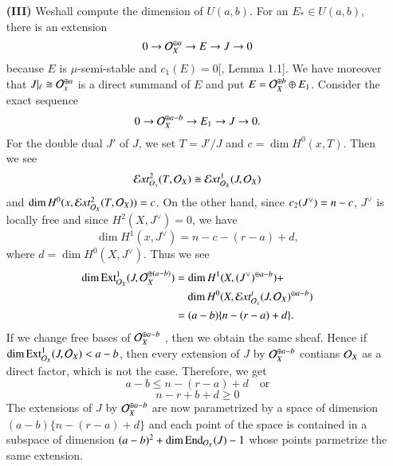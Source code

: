 \begin{itemize}
\item[{\bf(III)}] We\pageoriginale shall compute the dimension of $U(a,b)$. For an $E_{*} \in U(a, b)$, there is an extension
$$
0 \rightarrow \mathcal{O}_{X}^{\oplus a} \rightarrow E \rightarrow J \rightarrow 0
$$
because $E$ is $\mu$-semi-stable and $c_{1}(E) =0$[\cite{art12-key6}, Lemma 1.1]. We have moreover that $ J|_{\ell}\cong \mathcal{O}_{x}^{\oplus a}$ is a direct summand of $E$ and put $E=\mathcal{O}_{X}^{\oplus b} \oplus E_{1}$. Consider the exact sequence
$$
0\rightarrow \mathcal{O}_{X}^{\oplus a-b} \rightarrow E_{1} \rightarrow J \rightarrow 0.
$$
For the double dual $J'$ of $J$, we set $T= J'/J$ and $c =\dim H^{0}(x, T)$. Then we see
$$
\mathcal{E} xt_{O_{x}}^{2} (T, \mathcal{O}_{X})\cong  \mathcal{E} xt_{\mathcal{O}_{X}}^{1} (J, \mathcal{O}_{X})
$$
and $\dim H^{0}(x, \mathcal{E} xt_{\mathcal{O}_{X}}^{2} (T, \mathcal{O}_{X}))=c$. On the other hand, since $c_{2}(J^{\vee})\break =n-c$, $J^{\vee}$ is locally free and since $H^{2}(X, J^{\vee})=0$, we have
$$
\dim H^{1}(x, J^{\vee}) = n-c-(r-a) +d,
$$
where $d=\dim H^{0}(X, J^{\vee})$. Thus we see
\begin{equation*}
\begin{split}
\dim \operatorname{Ext}_{\mathcal{O}_{X}}^{1}(J, \mathcal{O}_{X}^{\oplus (a-b)})& = \dim H^{1}(X, (J^{\vee})^{\oplus a-b}) +\\
            &\quad \dim H^{0}(X, \mathcal{E} xt_{\mathcal{O}_{x}}^{t}(J, \mathcal{O}_{X})^{\oplus a-b})\\
            &= (a-b) \{n-(r-a) + d \}.            
\end{split}
\end{equation*}
If we change free bases of $\mathcal{O}_{X}^{\oplus a-b}$ , then we obtain the same sheaf. Hence if $\dim \operatorname{Ext}_{\mathcal{O}_{X}}^{1} (J, \mathcal{O}_{X}) < a-b$, then every extension of $J$ by $\mathcal{O}_{X}^{\oplus a-b}$ contians $\mathcal{O}_{X}$ as a direct factor, which is not the case. Therefore, we get
$$
a-b \leq n-(r-a)+d \quad \text{or}
$$
$$
n-r + b + d \geq 0
$$
The extensions of $J$ by $\mathcal{O}_{X}^{\oplus a-b}$ are now parametrized by a space of dimension $(a-b)\{n-(r-a) + d\}$ and each point of the space is contained in a subspace of dimension $(a-b)^{2} + \dim \operatorname{End}_{\mathcal{O}_{X}}(J)-1$ whose points parmetrize the same extension.


\end{itemize}
